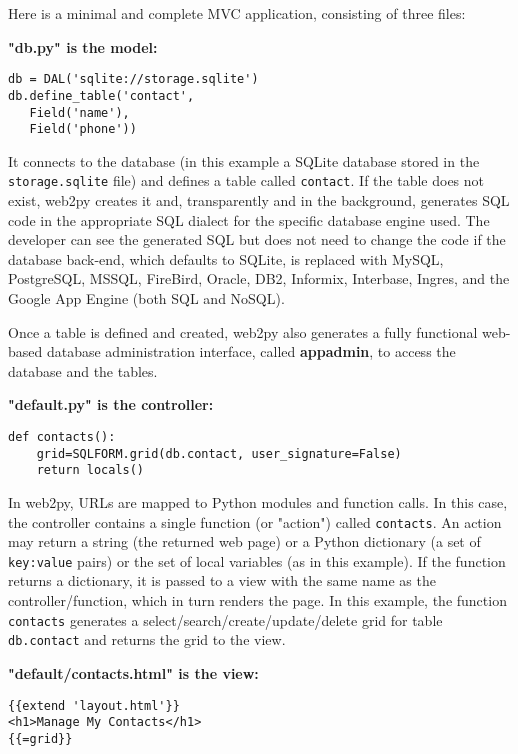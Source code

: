 \documentclass[justified,sixbynine,notoc]{tufte-book}
\def\ft{\small\tt}
\begin{document}
\begin{fullwidth}
Here is a minimal and complete MVC application, consisting of three files:

{\bf "db.py" is the model:}

\begin{lstlisting}
db = DAL('sqlite://storage.sqlite')
db.define_table('contact',
   Field('name'),
   Field('phone'))
\end{lstlisting}

It connects to the database (in this example a SQLite database stored in the {\ft storage.sqlite} file) and
defines a table called {\ft contact}. If the table does not exist, web2py creates it and, transparently
and in the background,
generates SQL code in the appropriate SQL dialect for the specific database engine used.
The developer can
see the generated SQL but does not need to change the code if the database back-end, which defaults to
SQLite, is replaced with MySQL, PostgreSQL, MSSQL, FireBird, Oracle, DB2, Informix, Interbase, Ingres, and the Google App Engine (both SQL and NoSQL).

Once a table is defined and created, web2py also generates a fully functional web-based database
administration interface, called {\bf appadmin}, to access the database and the tables.

{\bf "default.py" is the controller:}

\begin{lstlisting}
def contacts():
    grid=SQLFORM.grid(db.contact, user_signature=False)
    return locals()
\end{lstlisting}

In web2py, URLs are mapped to Python modules and function calls. In this case, the controller contains
a single function (or "action") called {\ft contacts}. An action may
return a string (the returned web page) or a Python dictionary (a set of
{\ft key:value} pairs) or the set of local variables (as in this example).
If the function returns a dictionary, it is passed to a view with the same
name as the controller/function, which in turn renders the page.
In this example, the function {\ft contacts} generates a select/search/create/update/delete grid for table {\ft db.contact}
and returns the grid to the view.

{\bf "default/contacts.html" is the view:}

\begin{lstlisting}[keywords={}]
{{extend 'layout.html'}}
<h1>Manage My Contacts</h1>
{{=grid}}
\end{lstlisting}


\end{fullwidth}
\end{document}
